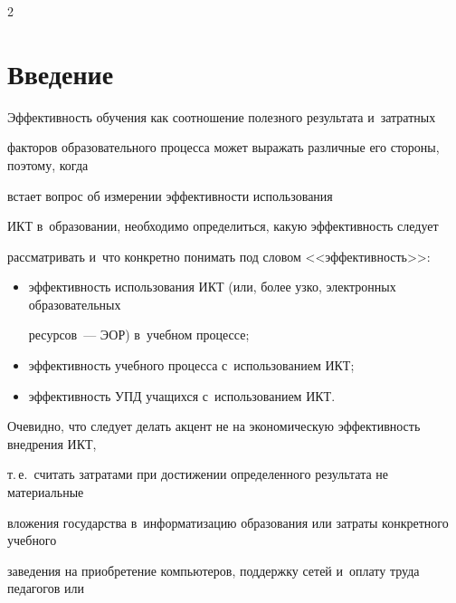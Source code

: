\begin{multicols}{2}





\label{st\stat}











\section{Введение }





     Эффективность обучения как соотношение полезного результата и~затратных


факторов образовательного процесса может выражать различные его стороны, поэтому, когда


встает вопрос об измерении эффективности использования


ИКТ в~образовании, необходимо определиться, какую эффективность следует


рассматривать и~что конкретно понимать под словом <<эффективность>>:


     \begin{itemize}


\item эффективность использования ИКТ (или, более узко, электронных образовательных


ресурсов~--- ЭОР) в~учебном процессе;


\item эффективность учебного процесса с~использованием ИКТ;


\item эффективность УПД учащихся с~использованием ИКТ.


\end{itemize}





   Очевидно, что следует делать акцент не на экономическую эффективность внедрения ИКТ,


т.\,е.\ считать затратами при достижении определенного результата не материальные


вложения государства в~информатизацию образования или затраты конкретного учебного


заведения на приобретение компьютеров, поддержку сетей и~оплату труда педагогов или



\end{multicols}
